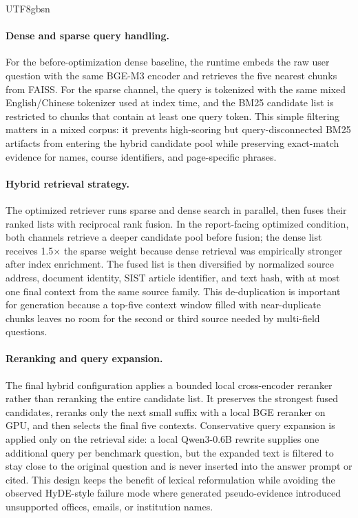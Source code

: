 \documentclass{article}
\begin{document}
\begin{CJK*}{UTF8}{gbsn}
\paragraph{Dense and sparse query handling.}
For the before-optimization dense baseline, the runtime embeds the raw user question with the same BGE-M3 encoder and retrieves the five nearest chunks from FAISS. For the sparse channel, the query is tokenized with the same mixed English/Chinese tokenizer used at index time, and the BM25 candidate list is restricted to chunks that contain at least one query token. This simple filtering matters in a mixed corpus: it prevents high-scoring but query-disconnected BM25 artifacts from entering the hybrid candidate pool while preserving exact-match evidence for names, course identifiers, and page-specific phrases.

\paragraph{Hybrid retrieval strategy.}
The optimized retriever runs sparse and dense search in parallel, then fuses their ranked lists with reciprocal rank fusion. In the report-facing optimized condition, both channels retrieve a deeper candidate pool before fusion; the dense list receives 1.5$\times$ the sparse weight because dense retrieval was empirically stronger after index enrichment. The fused list is then diversified by normalized source address, document identity, SIST article identifier, and text hash, with at most one final context from the same source family. This de-duplication is important for generation because a top-five context window filled with near-duplicate chunks leaves no room for the second or third source needed by multi-field questions.

\paragraph{Reranking and query expansion.}
The final hybrid configuration applies a bounded local cross-encoder reranker rather than reranking the entire candidate list. It preserves the strongest fused candidates, reranks only the next small suffix with a local BGE reranker on GPU, and then selects the final five contexts. Conservative query expansion is applied only on the retrieval side: a local Qwen3-0.6B rewrite supplies one additional query per benchmark question, but the expanded text is filtered to stay close to the original question and is never inserted into the answer prompt or cited. This design keeps the benefit of lexical reformulation while avoiding the observed HyDE-style failure mode where generated pseudo-evidence introduced unsupported offices, emails, or institution names.


\end{CJK*}
\end{document}
